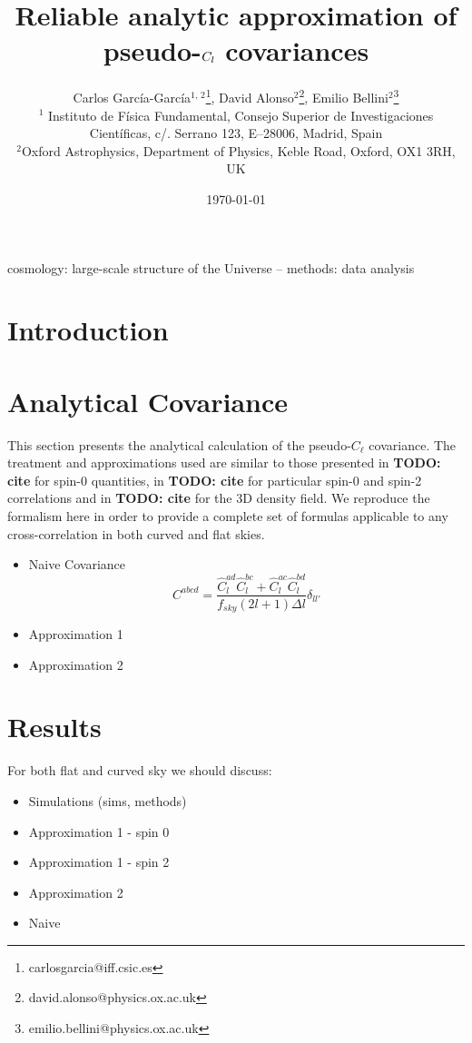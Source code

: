 \documentclass[useAMS,usenatbib]{mn2e}
\title[Reliable analytic approximation of pseudo-$\cl$ covariances]{Reliable analytic approximation of pseudo-$\cl$ covariances}
\author[C. Garc\'{i}a-Garc\'{i}a et al.]{Carlos Garc\'{i}a-Garc\'{i}a$^{1,\,2}$\thanks{carlosgarcia@iff.csic.es}, David Alonso$^2$\thanks{david.alonso@physics.ox.ac.uk}, Emilio Bellini$^2$\thanks{emilio.bellini@physics.ox.ac.uk}\\
$^{1}$ Instituto de Física Fundamental, Consejo Superior de Investigaciones
Científicas, c/. Serrano 123, E–28006, Madrid, Spain\\
$^{2}$Oxford Astrophysics, Department of Physics, Keble Road, Oxford, OX1 3RH, UK
}
\newcommand{\todo}[1]{{\bf TODO: #1}}
\newcommand{\pcl}[3]{\hat C_{#1}^{#2 #3}}
\begin{document}
  \date{\today}
   
  \maketitle

\begin{abstract}
\end{abstract}

\begin{keywords}
  cosmology: large-scale structure of the Universe -- methods: data analysis
\end{keywords}

\section{Introduction}
    
\section{Analytical Covariance}
This section presents the analytical calculation of the pseudo-$C_\ell$ covariance. The treatment and approximations used are similar to those presented in \todo{cite} for spin-0 quantities, in \todo{cite} for particular spin-0 and spin-2 correlations and in \todo{cite} for the 3D density field. We reproduce the formalism here in order to provide a complete set of formulas applicable to any cross-correlation in both curved and flat skies.



\begin{itemize}
\item Naive Covariance
  \begin{equation}
    C^{abcd} = \frac{\pcl{l}ad \pcl{l}bc + \pcl{l}ac \pcl{l}bd}{f_{sky} (2l +
      1) \Delta l} \delta_{ll'}
  \end{equation}
\item Approximation 1
\item Approximation 2
\end{itemize}

\section{Results}
For both flat and curved sky we should discuss:
\begin{itemize}
\item Simulations (sims, methods)
\item Approximation 1 - spin 0
\item Approximation 1 - spin 2
\item Approximation 2
\item Naive
\end{itemize}
\end{document}
